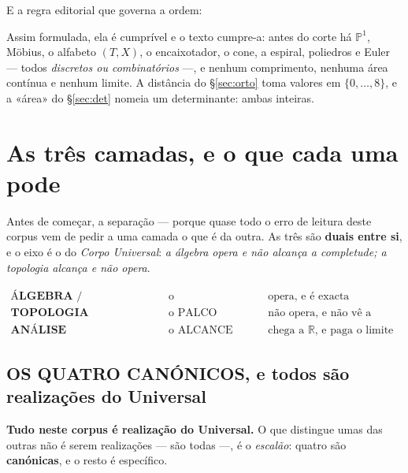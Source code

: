 \documentclass[11pt,a4paper]{article}
\begin{document}
\medskip
\noindent E a regra editorial que governa a ordem:
\begin{center}
\end{center}
Assim formulada, ela é cumprível e o texto cumpre-a: antes do corte há
$\mathbb{P}^1$, Möbius, o alfabeto $(T,X)$, o encaixotador, o cone, a espiral,
poliedros e Euler --- todos \emph{discretos ou combinatórios} ---, e nenhum
comprimento, nenhuma área contínua e nenhum limite. A distância do
\S\ref{sec:orto} toma valores em $\{0,\ldots,8\}$, e a «área» do
\S\ref{sec:det} nomeia um determinante: ambas inteiras.

\section{As três camadas, e o que cada uma pode}\label{sec:camadas}

Antes de começar, a separação --- porque quase todo o erro de leitura deste corpus vem de
pedir a uma camada o que é da outra. As três são \textbf{duais entre si}, e o eixo é o do
\emph{Corpo Universal}: \emph{a álgebra opera e não alcança a completude; a topologia
alcança e não opera}.

\[
\boxed{
\begin{array}{lll}
\textbf{ÁLGEBRA / ARITMÉTICA} & \text{o FUNDAMENTO} & \text{opera, e é exacta}\\[2pt]
\textbf{TOPOLOGIA} & \text{o PALCO} & \text{não opera, e não vê a medida}\\[2pt]
\textbf{ANÁLISE} & \text{o ALCANCE} & \text{chega a }\mathbb{R}\text{, e paga o limite}
\end{array}}
\]

\subsection*{OS QUATRO CANÓNICOS, e todos são realizações do Universal}

\textbf{Tudo neste corpus é realização do Universal.} O que distingue umas das outras não é
serem realizações --- são todas ---, é o \emph{escalão}: quatro são \textbf{canónicas}, e o
resto é específico.
\end{document}
